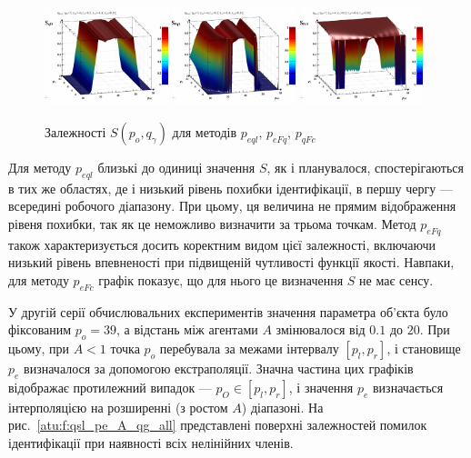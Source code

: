 \documentclass[a4paper,13pt]{atuaref}
\begin{document}
\begin{figure}[htb!]
  \centerline{
    \includegraphics[width=0.32\textwidth]{p3/p/qls_pe-p_po_qg_Sql_all.png}
    \hfill
    \includegraphics[width=0.32\textwidth]{p3/p/qls_pe-p_po_qg_SFq_all.png}
    \hfill
    \includegraphics[width=0.32\textwidth]{p3/p/qls_pe-p_po_qg_SFc_all.png}
  }
  \caption{Залежності $S(p_o,q_\gamma)$ для методів $p_{eql}$, $p_{eFq}$, $p_{qFc}$}
  \label{atu:f:qsl_S_po_qg_all}
\end{figure}

Для методу $ p_{eql} $ близькі до одиниці значення $ S $, як і планувалося,
спостерігаються в тих же областях, де і низький рівень похибки ідентифікації, в
першу чергу --- всередині робочого діапазону. При цьому, ця величина не
прямим відображення рівеня похибки, так як це неможливо визначити за трьома точкам.
Метод $ p_{eFq} $ також характеризується досить коректним видом цієї залежності,
включаючи низький рівень впевненості при підвищеній чутливості функції якості.
Навпаки, для методу $ p_ {eFc} $ графік показує, що для нього це визначення $ S$ не має сенсу.

У другій серії обчислювальних експериментів значення параметра об'єкта було
фіксованим $ p_o = 39 $, а відстань між агентами $ A $ змінювалося від $ 0.1 $
до $ 20 $. При цьому, при $ A <1 $ точка $ p_o $ перебувала за межами інтервалу
$ [p_l, p_r] $, і становище $ p_e $ визначалося за допомогою екстраполяції.
Значна частина цих графіків відображає протилежний випадок --- $ p_O \in [p_l,p_r] $,
і значення $ p_e $ визначається інтерполяцією на розширенні (з ростом $A $) діапазоні.
На рис.~\ref{atu:f:qsl_pe_A_qg_all} представлені поверхні залежностей помилок ідентифікації
при наявності всіх нелінійних членів.
\end{document}
